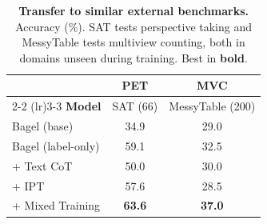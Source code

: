 \begin{table}[t]
  \caption{\textbf{Transfer to similar external benchmarks.} Accuracy (\%). SAT tests perspective taking and MessyTable tests multiview counting, both in domains unseen during training. Best in \textbf{bold}.}
  \vspace{-1em}
  \centering
  \setlength{\tabcolsep}{6pt}
  \small
  \begin{tabular}{l cc}
    \toprule
    & \textbf{PET} & \textbf{MVC} \\
    \cmidrule(lr){2-2} \cmidrule(lr){3-3}
    \textbf{Model}
      & \footnotesize SAT (66)
      & \footnotesize MessyTable (200) \\
    \midrule
    Bagel (base)       & 34.9 & 29.0 \\
    Bagel (label-only) & 59.1 & 32.5 \\
    + Text CoT         & 50.0 & 30.0 \\
    + IPT              & 57.6 & 28.5 \\
    + Mixed Training   & \textbf{63.6} & \textbf{37.0} \\
    \bottomrule
  \end{tabular}
  \label{tab:transfer}
\end{table}
\vspace{-1em}
